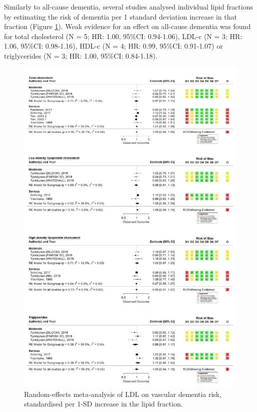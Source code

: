 \documentclass[a4paper, twoside]{templates/ociamthesis}
\begin{document}
Similarly to all-cause dementia, several studies analysed individual lipid fractions by estimating the risk of dementia per 1 standard deviation increase in that fraction (Figure \ref{fig:lipidFractionsAD}). Weak evidence for an effect on all-cause dementia was found for total cholesterol (N = 5; HR: 1.00, 95\%CI: 0.94-1.06), LDL-c (N = 3; HR: 1.06, 95\%CI: 0.98-1.16), HDL-c (N = 4; HR: 0.99, 95\%CI: 0.91-1.07) or triglycerides (N = 3; HR: 1.00, 95\%CI: 0.84-1.18).





\begin{figure}[H]
\includegraphics[width=1\linewidth]{figures/sys-rev/fp_lipids_composite_AD} \caption[Random-effects meta-analysis of four lipid fractions on Alzheimer's disease]{Random-effects meta-analysis of LDL on vascular dementia risk, standardised per 1-SD increase in the lipid fraction.}\label{fig:lipidFractionsAD}
\end{figure}
\end{document}
